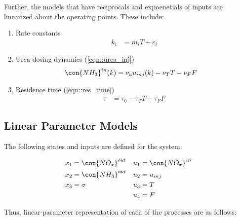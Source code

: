 Further, the models that have reciprocals and expoenetials of inputs are linearized about the operating points. These include:
\begin{enumerate}
    \item Rate constants
        \begin{align*}
            k_i &= m_i T + c_i
        \end{align*}
    \item Urea dosing dynamics (\ref{eqn::urea_inj})
        \begin{align*}
            \con{NH_3}^{in}(k) &= \nu_u u_{inj}(k) - \nu_T T - \nu_F F
        \end{align*}
    \item Residence time (\ref{eqn::res_time})
        \begin{align*}
            \tau &= \tau_0 - \tau_T T - \tau_F F
        \end{align*}
\end{enumerate}

\subsection{Linear Parameter Models}
The following states and inputs are defined for the system:

\begin{align*}
    x_1 &= \con{NO_x}^{out} & u_1 &= \con{NO_x}^{in} \\
    x_2 &= \con{NH_3}^{out} & u_2 &= u_{inj} \\
    x_3 &= \sigma & u_3 &= T\\
        &         & u_4 &= F
\end{align*}

Thus, linear-parameter representation of each of the processes are as follows:

% 

% 

